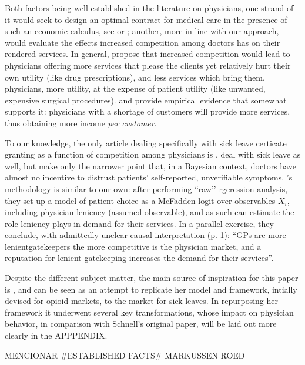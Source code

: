 \documentclass{article}
\begin{document}
Both factors being well established in the literature on physicians, one strand of it would seek to design an optimal contract for medical care in the presence of such an economic calculus, see \cite{chone-ma} or \cite{optimal-altruism}; another, more in line with our approach, would evaluate the effects increased competition among doctors has on their rendered services. In general, \cite{currie2023effects} propose that increased competition would lead to physicians offering more services that please the clients yet relatively hurt their own utility (like drug prescriptions), and less services which bring them, physicians, more utility, at the expense of patient utility (like unwanted, expensive surgical procedures). \cite{iversen-luras} and \cite{iversen2004} provide empirical evidence that somewhat supports it: physicians with a shortage of customers will provide more services, thus obtaining more income \textit{per customer}.

To our knowledge, the only article dealing specifically with sick leave certicate granting as a function of competition among physicians is \cite{markussen-roed}. \cite{cln} deal with sick leave as well, but make only the narrower point that, in a Bayesian context, doctors have almost no incentive to distrust patients’ self-reported, unverifiable symptoms. \citeauthor{markussen-roed}’s methodology is similar to our own: after performing ``raw'’ rgeression analysis, they set-up a model of patient choice as a McFadden logit over observables $X_i$, including physician leniency (assumed observable), and as such can estimate the role leniency plays in demand for their services. In a parallel exercise, they conclude, with admittedly unclear causal interpretation (p. 1): ``GPs are more lenientgatekeepers the more competitive is the physician market, and a reputation for lenient gatekeeping increases the demand for their services''.

Despite the different subject matter, the main source of inspiration for this paper is \cite{schnell2017physician}, and can be seen as an attempt to replicate her model and framework, intially devised for opioid markets, to the market for sick leaves. In repurposing her framework it underwent several key transformations, whose impact on physician behavior, in comparison with Schnell’s original paper, will be laid out more clearly in the APPPENDIX.

MENCIONAR #ESTABLISHED FACTS# MARKUSSEN ROED


\newpage
	 

\end{document}
